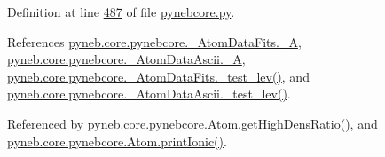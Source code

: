 Definition at line \hyperlink{pynebcore_8py_source_l00487}{487} of file \hyperlink{pynebcore_8py_source}{pynebcore.\-py}.



References \hyperlink{pynebcore_8py_source_l00100}{pyneb.\-core.\-pynebcore.\-\_\-\-Atom\-Data\-Fits.\-\_\-\-A}, \hyperlink{pynebcore_8py_source_l00415}{pyneb.\-core.\-pynebcore.\-\_\-\-Atom\-Data\-Ascii.\-\_\-\-A}, \hyperlink{pynebcore_8py_source_l00178}{pyneb.\-core.\-pynebcore.\-\_\-\-Atom\-Data\-Fits.\-\_\-test\-\_\-lev()}, and \hyperlink{pynebcore_8py_source_l00447}{pyneb.\-core.\-pynebcore.\-\_\-\-Atom\-Data\-Ascii.\-\_\-test\-\_\-lev()}.



Referenced by \hyperlink{pynebcore_8py_source_l01719}{pyneb.\-core.\-pynebcore.\-Atom.\-get\-High\-Dens\-Ratio()}, and \hyperlink{pynebcore_8py_source_l02233}{pyneb.\-core.\-pynebcore.\-Atom.\-print\-Ionic()}.


